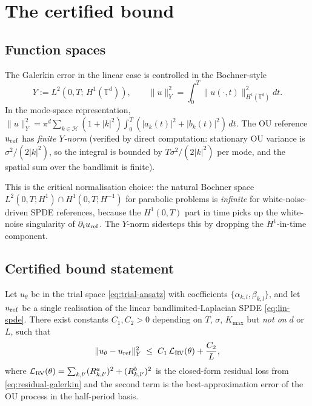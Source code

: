 \section{The certified bound}
\label{sec:theorem}

\subsection{Function spaces}
\label{sec:thm:spaces}

The Galerkin error in the linear case is controlled in the Bochner-style
\begin{equation}
Y := L^2(0, T;\, H^1(\mathbb{T}^d)),
\qquad
\|u\|_Y^2 = \int_0^T \|u(\cdot, t)\|_{H^1(\mathbb{T}^d)}^2 dt.
\label{eq:Y-norm}
\end{equation}
In the mode-space representation,
$\|u\|_Y^2 = \pi^d \sum_{k \in \mathcal{H}} (1 + |k|^2) \int_0^T
(|a_k(t)|^2 + |b_k(t)|^2)\, dt$. The OU reference $u_{\rm ref}$ has
\emph{finite $Y$-norm} (verified by direct computation: stationary OU
variance is $\sigma^2/(2|k|^2)$, so the integral is bounded by
$T\sigma^2/(2|k|^2)$ per mode, and the spatial sum over the bandlimit
is finite).

This is the critical normalisation choice: the natural Bochner space
$L^2(0, T; H^1) \cap H^1(0, T; H^{-1})$ for parabolic problems is
\emph{infinite} for white-noise-driven SPDE references, because the
$H^1(0, T)$ part in time picks up the white-noise singularity of
$\partial_t u_{\rm ref}$. The $Y$-norm sidesteps this by dropping the
$H^1$-in-time component.

\subsection{Certified bound statement}
\label{sec:thm:statement}

\begin{theorem}
\label{thm:main}
Let $u_\theta$ be in the trial space \eqref{eq:trial-ansatz} with
coefficients $\{\alpha_{k, l}, \beta_{k, l}\}$, and let $u_{\rm ref}$
be a single realisation of the linear bandlimited-Laplacian SPDE
\eqref{eq:lin-spde}. There exist constants $C_1, C_2 > 0$ depending on
$T$, $\sigma$, $K_{\max}$ but \emph{not on} $d$ or $L$, such that
\begin{equation}
\|u_\theta - u_{\rm ref}\|_Y^2
\;\le\;
C_1\,\mathcal{L}_{\rm RV}(\theta) + \frac{C_2}{L},
\label{eq:thm-bound}
\end{equation}
where $\mathcal{L}_{\rm RV}(\theta) = \sum_{k, l'} (R_{k, l'}^a)^2
+ (R_{k, l'}^b)^2$ is the closed-form residual loss from
\eqref{eq:residual-galerkin} and the second term is the
best-approximation error of the OU process in the half-period basis.
\end{theorem}

